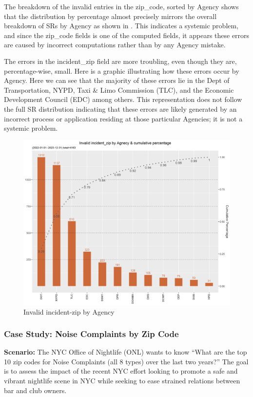 \documentclass[12pt, titlepage]{article}
\begin{document}
	The breakdown of the invalid entries in the zip\_code, sorted by Agency shows that the distribution by percentage
	almost precisely mirrors the overall breakdown of SRs by Agency as shown in . This indicates a systemic problem, and since the
	zip\_code fields is one of the computed fields, it appears these errors are caused by incorrect computations rather
	than by any Agency mistake.
	
	The  errors in the incident\_zip field are more troubling, even though they are, percentage-wise, small. Here is a graphic 
	illustrating how these errors occur by Agency. Here we can see that the majority of these errors lie in the Dept of Transportation,
	NYPD, Taxi \& Limo Commission (TLC), and the Economic Development Council (EDC) among others. This representation
	does not follow the full SR distribution indicating that these errors are likely generated by an incorrect
	process or application residing at those particular Agencies; it is not a systemic problem.

	\begin{figure}[H]
	  \centering
		  \includegraphics[width=\textwidth]{invalid_incident_zip.png}
		  \caption{Invalid incident-zip by Agency}
		  \label{fig:invalid_incident_zip}
	\end{figure}
	
		\subsubsection{Case Study: Noise Complaints by Zip Code}
		\textbf{Scenario:} The NYC Office of Nightlife (ONL) wants to know ``What are the top 10 zip codes for Noise Complaints (all 8 types) over the last two years?''
		The goal is to assess the impact of the recent NYC effort looking to promote a safe and vibrant nightlife scene in NYC while seeking to ease
		strained relations between bar and club owners. 
		
\end{document}
